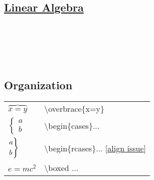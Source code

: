 \subsection*{\href{https://www.overleaf.com/learn/latex/Matrices}{Linear Algebra}}

\\
\\
\\
\\


\subsection*{Organization}
\begin{tabular}{l l}

$\overbrace{x=y}$ &  \textbackslash overbrace\{x=y\} \\
$\begin{cases} a \\ b \end{cases}$ & \textbackslash begin\{cases\}... \\
$\begin{rcases} a \\ b \end{rcases}$ & \textbackslash begin\{rcases\}... [\href{https://tex.stackexchange.com/questions/385148/spacing-in-cases}{align issue}]\\
$\boxed{e=mc^2}$ & \textbackslash boxed ... \\

\end{tabular}\ \\


